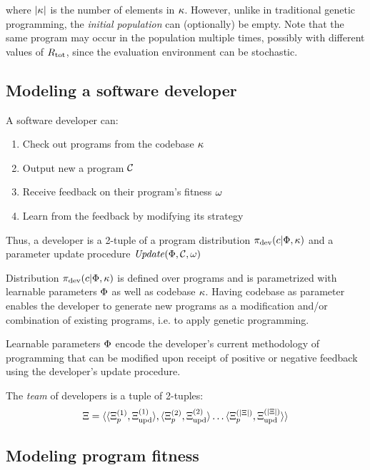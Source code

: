 where $|\kappa|$ is the number of elements in $\kappa$.
However, unlike in traditional genetic programming, the \emph{initial population} can (optionally) be empty.
Note that the same program may occur in the population multiple times, possibly with different values of $R_\text{tot}$, since the evaluation environment can be stochastic.

\subsection{Modeling a software developer}
\label{sec:developer}

A software developer can:
\begin{enumerate}
    \item Check out programs from the codebase $\kappa$
    \item Output new a program $\mathcal{C}$
    \item Receive feedback on their program's fitness $\omega$ 
    \item Learn from the feedback by modifying its strategy
\end{enumerate}

Thus, a developer is a 2-tuple of a program distribution $\pi_\text{dev}(c | \Phi, \kappa)$ and a parameter update procedure $\mathit{Update}(\Phi, \mathcal{C}, \omega)$

Distribution $\pi_{\text{dev}}(c | \Phi, \kappa)$ is defined over programs and is parametrized with learnable parameters $\Phi$ as well as codebase $\kappa$. 
Having codebase as parameter enables the developer to generate new programs as a modification and/or combination of existing programs, i.e. to apply genetic programming.

Learnable parameters $\Phi$ encode the developer's current methodology of programming that can be modified upon receipt of positive or negative feedback using the developer's update procedure. 

The \emph{team} of developers is a tuple of 2-tuples:
\begin{equation}
    \Xi = \langle \langle \Xi_p^{(1)}, \Xi_\text{upd}^{(1)} \rangle, \langle \Xi_p^{(2)}, \Xi_\text{upd}^{(2)} \rangle \dots \langle \Xi_p^{(|\Xi|)}, \Xi_\text{upd}^{(|\Xi|)} \rangle \rangle
\end{equation}

\newpage \subsection{Modeling program fitness}
\label{sec:fitness}

